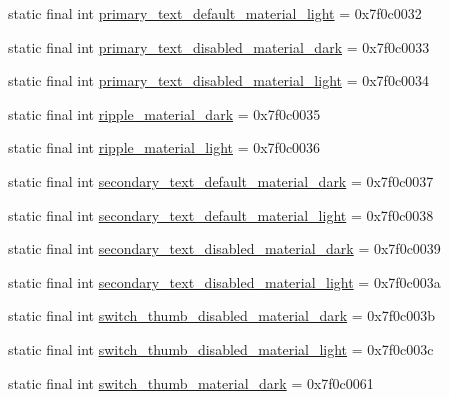 \begin{CompactItemize}
\item 
static final int \hyperlink{classandroid_1_1support_1_1mediacompat_1_1_r_1_1color_b3345312301bca56bcdfe8ad8c921c51}{primary\_\-text\_\-default\_\-material\_\-light} = 0x7f0c0032
\item 
static final int \hyperlink{classandroid_1_1support_1_1mediacompat_1_1_r_1_1color_85d832c4cbcb5505f79285c38ca12e25}{primary\_\-text\_\-disabled\_\-material\_\-dark} = 0x7f0c0033
\item 
static final int \hyperlink{classandroid_1_1support_1_1mediacompat_1_1_r_1_1color_b77d353aae081d3a3fd155c196af47a9}{primary\_\-text\_\-disabled\_\-material\_\-light} = 0x7f0c0034
\item 
static final int \hyperlink{classandroid_1_1support_1_1mediacompat_1_1_r_1_1color_78daa4eea439b98eb10b46f9b930d812}{ripple\_\-material\_\-dark} = 0x7f0c0035
\item 
static final int \hyperlink{classandroid_1_1support_1_1mediacompat_1_1_r_1_1color_9e79f223ee8876f09abcab8b9cea4c7c}{ripple\_\-material\_\-light} = 0x7f0c0036
\item 
static final int \hyperlink{classandroid_1_1support_1_1mediacompat_1_1_r_1_1color_87c4ce593c1a06791e40dc00e9a74a2e}{secondary\_\-text\_\-default\_\-material\_\-dark} = 0x7f0c0037
\item 
static final int \hyperlink{classandroid_1_1support_1_1mediacompat_1_1_r_1_1color_4ad49474c95bac30a808877f22c6a420}{secondary\_\-text\_\-default\_\-material\_\-light} = 0x7f0c0038
\item 
static final int \hyperlink{classandroid_1_1support_1_1mediacompat_1_1_r_1_1color_9db05f5526c26dd616254e50bc71f87c}{secondary\_\-text\_\-disabled\_\-material\_\-dark} = 0x7f0c0039
\item 
static final int \hyperlink{classandroid_1_1support_1_1mediacompat_1_1_r_1_1color_3d129fb5f54bec00bb66be25954fde86}{secondary\_\-text\_\-disabled\_\-material\_\-light} = 0x7f0c003a
\item 
static final int \hyperlink{classandroid_1_1support_1_1mediacompat_1_1_r_1_1color_53a4214162f5ed7a940f4c8bdf877f13}{switch\_\-thumb\_\-disabled\_\-material\_\-dark} = 0x7f0c003b
\item 
static final int \hyperlink{classandroid_1_1support_1_1mediacompat_1_1_r_1_1color_a09b31ac28ae2c20d9a4d44d11f3bb11}{switch\_\-thumb\_\-disabled\_\-material\_\-light} = 0x7f0c003c
\item 
static final int \hyperlink{classandroid_1_1support_1_1mediacompat_1_1_r_1_1color_6c0e67b1051f6c161e37fb7c100172b8}{switch\_\-thumb\_\-material\_\-dark} = 0x7f0c0061

\end{CompactItemize}
